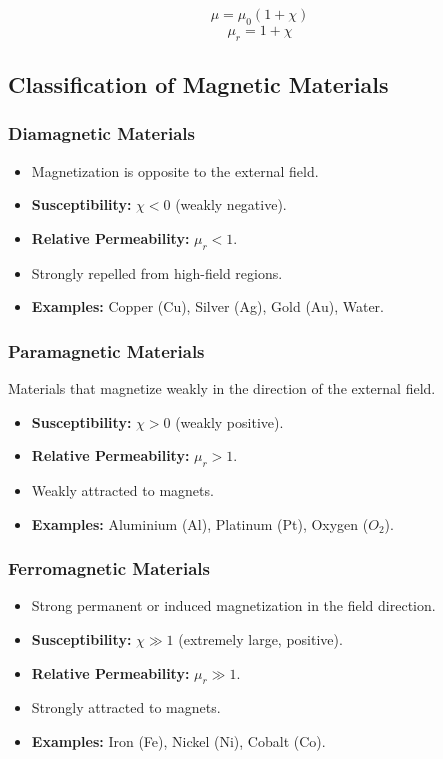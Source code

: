 \documentclass[11pt,a4paper]{article}
\begin{document}
\begin{formulabox}
    \[ \mu = \mu_0(1 + \chi) \]
    \[ \mu_r = 1 + \chi \]
\end{formulabox}

\subsection{Classification of Magnetic Materials}

\subsubsection{Diamagnetic Materials}
\begin{itemize}
    \item Magnetization is opposite to the external field.
    \item \textbf{Susceptibility:} $\chi < 0$ (weakly negative).
    \item \textbf{Relative Permeability:} $\mu_r < 1$.
    \item Strongly repelled from high-field regions.
    \item \textbf{Examples:} Copper (Cu), Silver (Ag), Gold (Au), Water.
\end{itemize}

\subsubsection{Paramagnetic Materials}
\begin{pyqbox}
    Materials that magnetize weakly in the direction of the external field.
\end{pyqbox}
\begin{itemize}
    \item \textbf{Susceptibility:} $\chi > 0$ (weakly positive).
    \item \textbf{Relative Permeability:} $\mu_r > 1$.
    \item Weakly attracted to magnets.
    \item \textbf{Examples:} Aluminium (Al), Platinum (Pt), Oxygen ($O_2$).
\end{itemize}

\subsubsection{Ferromagnetic Materials}
\begin{itemize}
    \item Strong permanent or induced magnetization in the field direction.
    \item \textbf{Susceptibility:} $\chi \gg 1$ (extremely large, positive).
    \item \textbf{Relative Permeability:} $\mu_r \gg 1$.
    \item Strongly attracted to magnets.
    \item \textbf{Examples:} Iron (Fe), Nickel (Ni), Cobalt (Co).
\end{itemize}
\end{document}
